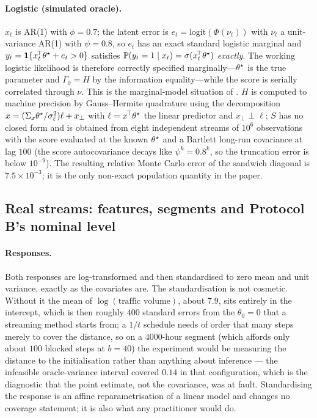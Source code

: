 \paragraph{Logistic (simulated oracle).}
$x_t$ is AR(1) with $\phi=0.7$; the latent error is $e_t=\mathrm{logit}(\Phi(\nu_t))$ with
$\nu_t$ a unit-variance AR(1) with $\psi=0.8$, so $e_t$ has an exact standard logistic
marginal and $y_t=\mathbf{1}\{x_t^{\!\top}\theta^\star+e_t>0\}$ satisfies
$\mathbb{P}(y_t=1\mid x_t)=\sigma(x_t^{\!\top}\theta^\star)$ \emph{exactly}. The working logistic likelihood
is therefore correctly specified marginally---$\theta^\star$ is the true parameter and $\Gamma_0=H$ by
the information equality---while the score is serially correlated through $\nu$. This is the
marginal-model situation of \citet{liang1986longitudinal}. $H$ is computed to machine
precision by Gauss--Hermite quadrature using the decomposition
$x=(\Sigma_x\theta^\star/\sigma_\ell^2)\ell+x_\perp$ with $\ell=x^{\!\top}\theta^\star$ the linear predictor and
$x_\perp\perp\ell$; $S$ has no closed form and is obtained from eight independent streams of
$10^6$ observations with the score evaluated at the known $\theta^\star$ and a Bartlett long-run
covariance at lag $100$ (the score autocovariance decays like $\psi^{k}=0.8^{k}$, so the
truncation error is below $10^{-9}$). The resulting relative Monte Carlo error of the
sandwich diagonal is $7.5\times10^{-3}$; it is the only non-exact population quantity in the
paper.

\subsection{Real streams: features, segments and Protocol B's nominal level}
\label{app:real}

\paragraph{Responses.} Both responses are log-transformed and then standardised to zero mean and
unit variance, exactly as the covariates are. The standardisation is not cosmetic. Without it the
mean of $\log(\text{traffic volume})$, about $7.9$, sits entirely in the intercept, which is then
roughly $400$ standard errors from the $\theta_0=0$ that a streaming method starts from; a $1/t$
schedule needs of order that many steps merely to cover the distance, so on a $4000$-hour segment
(which affords only about $100$ blocked steps at $b=40$) the experiment would be measuring the distance
to the initialisation rather than anything about inference --- the infeasible oracle-variance
interval covered $0.14$ in that configuration, which is the diagnostic that the point estimate,
not the covariance, was at fault. Standardising the response is an affine reparametrisation of a
linear model and changes no coverage statement; it is also what any practitioner would do.

